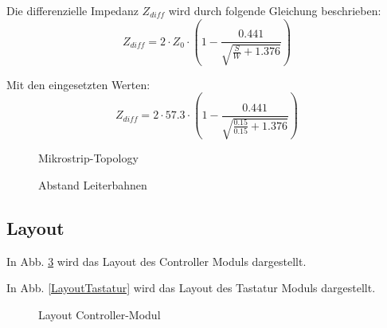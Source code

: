 Die differenzielle Impedanz \( Z_{diff} \) wird durch folgende Gleichung beschrieben:
\begin{equation} \label{Impedanz}
	Z_{diff} = 2 \cdot Z_0 \cdot \left( 1 - \frac{0.441}{\sqrt{\frac{S}{W} + 1.376}} \right)
\end{equation}

Mit den eingesetzten Werten:
\begin{equation} \label{BSPImpedanz}
	Z_{diff} = 2 \cdot 57.3 \cdot \left( 1 - \frac{0.441}{\sqrt{\frac{0.15}{0.15} + 1.376}} \right)
\end{equation}






\begin{figure}[H]
    \centering    
    \caption{Mikrostrip-Topology}
    \label{MikrostripTopology}
\end{figure}

\begin{figure}[H]
    \centering    
    \caption{Abstand Leiterbahnen}
    \label{AbstandLeiterbahnen}
\end{figure}


\subsection{Layout}

In Abb. \ref{LayoutController} wird das Layout des Controller Moduls dargestellt.

In Abb. \ref{LayoutTastatur} wird das Layout des Tastatur Moduls dargestellt. 

\begin{figure}[H]
	\centering    
	\caption{Layout Controller-Modul}
	\label{LayoutController}
\end{figure}

